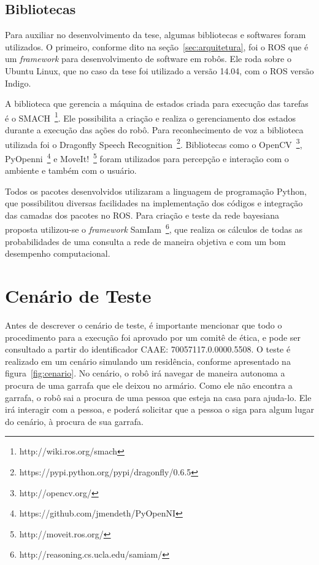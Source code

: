 \subsection{Bibliotecas}
\label{sec:bibliotecas}
Para auxiliar no desenvolvimento da tese, algumas bibliotecas e softwares foram utilizados. O primeiro, conforme dito na seção~\ref{sec:arquitetura}, foi o ROS que é um \emph{framework} para desenvolvimento de software em robôs. Ele roda sobre o Ubuntu Linux, que no caso da tese foi utilizado a versão 14.04, com o ROS versão Indigo.

A biblioteca que gerencia a máquina de estados criada para execução das tarefas é o SMACH~\footnote{http://wiki.ros.org/smach}. Ele possibilita a criação e realiza o gerenciamento dos estados durante a execução das ações do robô. Para reconhecimento de voz a biblioteca utilizada foi o Dragonfly Speech Recognition~\footnote{https://pypi.python.org/pypi/dragonfly/0.6.5}. Bibliotecas como o OpenCV~\footnote{http://opencv.org/}, PyOpenni~\footnote{https://github.com/jmendeth/PyOpenNI} e MoveIt!~\footnote{http://moveit.ros.org/} foram utilizados para percepção e interação com o ambiente e também com o usuário.

Todos os pacotes desenvolvidos utilizaram a linguagem de programação Python, que possibilitou diversas facilidades na implementação dos códigos e integração das camadas dos pacotes no ROS. Para criação e teste da rede bayesiana proposta utilizou-se o \emph{framework} SamIam~\footnote{http://reasoning.cs.ucla.edu/samiam/}, que realiza os cálculos de todas as probabilidades de uma consulta a rede de maneira objetiva e com um bom desempenho computacional.

\section{Cenário de Teste} %
\label{sec:cenario}
Antes de descrever o cenário de teste, é importante mencionar que todo o procedimento para a execução foi aprovado por um comitê de ética, e pode ser consultado a partir do identificador CAAE: 70057117.0.0000.5508. O teste é realizado em um cenário simulando um residência, conforme apresentado na figura~\ref{fig:cenario}. No cenário, o robô irá navegar de maneira autonoma a procura de uma garrafa que ele deixou no armário. Como ele não encontra a garrafa, o robô sai a procura de uma pessoa que esteja na casa para ajuda-lo. Ele irá interagir com a pessoa, e poderá solicitar que a pessoa o siga para algum lugar do cenário, à procura de sua garrafa.


